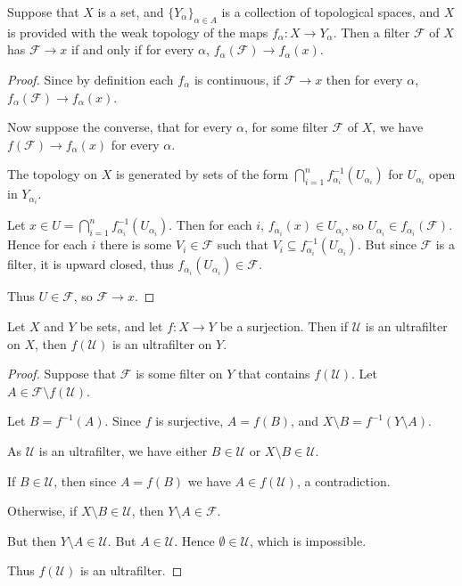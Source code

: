 \documentclass{owmaths}
\begin{document}
\begin{proposition}
    Suppose that $X$ is a set, and $\{Y_\alpha\}_{\alpha \in A}$
    is a collection of topological spaces, and $X$ is provided
    with the weak topology of the maps $f_\alpha:X\rightarrow Y_\alpha$.
    Then a filter $\mathcal{F}$ of $X$
    has $\mathcal{F}\rightarrow x$ if and only if for
    every $\alpha$, $f_\alpha(\mathcal{F})\rightarrow f_\alpha(x)$. 
\end{proposition}
\begin{proof}
    Since by definition each $f_\alpha$ is continuous, if $\mathcal{F}\rightarrow x$
    then for every $\alpha$, $f_\alpha(\mathcal{F})\rightarrow f_\alpha(x)$. 
    
    Now suppose the converse, that for every $\alpha$, 
    for some filter $\mathcal{F}$ of $X$, we have $f(\mathcal{F})\rightarrow f_\alpha(x)$
    for every $\alpha$. 
    
    The topology on $X$ is generated by sets of the form $\bigcap_{i=1}^n f_{\alpha_i}^{-1}(U_{\alpha_i})$
    for $U_{\alpha_i}$ open in $Y_{\alpha_i}$. 
    
    Let $x \in U = \bigcap_{i=1}^n f_{\alpha_i}^{-1}(U_{\alpha_i})$. Then 
    for each $i$, 
    $f_{\alpha_i}(x) \in U_{\alpha_i}$, 
    so $U_{\alpha_i} \in f_{\alpha_i}(\mathcal{F})$. Hence for each $i$
    there is some $V_i \in \mathcal{F}$
    such that $V_i \subseteq f_{\alpha_i}^{-1}(U_{\alpha_i})$.
    But since $\mathcal{F}$ is a filter,
    it is upward closed, thus $f_{\alpha_i}(U_{\alpha_{i}}) \in\mathcal{F}$.
    
    Thus $U \in \mathcal{F}$, so $\mathcal{F} \rightarrow x$. 
\end{proof}

\begin{proposition}
    Let $X$ and $Y$ be sets, and let $f:X\rightarrow Y$ be a surjection.
    Then if $\mathcal{U}$ is an ultrafilter on $X$, then $f(\mathcal{U})$
    is an ultrafilter on $Y$.
\end{proposition}
\begin{proof}
    Suppose that $\mathcal{F}$ is some filter on $Y$ 
    that contains $f(\mathcal{U})$. Let $A \in \mathcal{F}\setminus f(\mathcal{U})$. 
    
    Let $B = f^{-1}(A)$. Since $f$ is surjective, $A = f(B)$, and $X\setminus B = f^{-1}(Y\setminus A)$.
    
    As $\mathcal{U}$ is an ultrafilter, we have either $B \in \mathcal{U}$
    or $X\setminus B \in \mathcal{U}$.
    
    If $B \in \mathcal{U}$, then since $A = f(B)$ we have $A \in f(\mathcal{U})$,
    a contradiction.
    
    Otherwise, if $X\setminus B \in \mathcal{U}$, then $Y \setminus A \in \mathcal{F}$.
    
    But then $Y \setminus A \in \mathcal{U}$. But $A \in \mathcal{U}$.
    Hence $\emptyset \in \mathcal{U}$, which is impossible.
    
    Thus $f(\mathcal{U})$ is an ultrafilter.
\end{proof}
\end{document}
